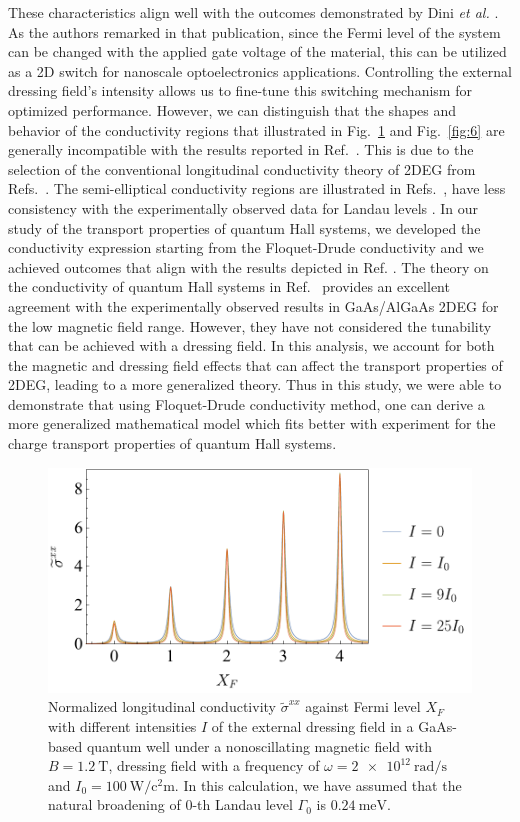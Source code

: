 These characteristics align well with the outcomes demonstrated by Dini \textit{et al.} \cite{dini16}.  As the authors remarked in that publication, since the Fermi level of the system can be changed with the applied gate voltage of the material, this can be utilized as a 2D switch for nanoscale optoelectronics applications. Controlling  the external dressing field's intensity allows us to fine-tune this switching mechanism for optimized performance.
However, we can distinguish that the shapes and behavior of the conductivity regions that illustrated in Fig.~\ref{fig:5} and Fig.~\ref{fig:6} are generally incompatible with the results reported in Ref.~\cite{dini16}. This is due to the selection of the conventional longitudinal conductivity theory of 2DEG from Refs.~\cite{ando74_1,ando82}. The semi-elliptical conductivity regions are  illustrated in Refs.~\cite{dini16,ando74_1,ando82}, have less consistency with the experimentally observed data for Landau levels \cite{endo09}.
In our study of the transport properties of quantum Hall systems, we developed the conductivity expression starting from the Floquet-Drude conductivity \cite{wackerl20} and we achieved outcomes that align with the results depicted in Ref. \cite{endo09}.
The theory on the conductivity of quantum Hall systems in Ref.~\cite{endo09} provides an excellent agreement with the experimentally observed results in GaAs/AlGaAs 2DEG for the low magnetic field range.
However, they have not considered the tunability that can be achieved with a dressing field. In this analysis, we account for both the magnetic and dressing field effects that can affect the transport properties of 2DEG, leading to a more generalized theory. Thus in this study, we were able to demonstrate that using Floquet-Drude conductivity method, one can derive a more generalized mathematical model which fits better with experiment for the charge transport properties of quantum Hall systems.

\begin{figure}[t]
\includegraphics[scale=0.54]{figures/fig_4}
\caption{ Normalized longitudinal conductivity $\widetilde{\sigma}^{xx}$ against Fermi level $X_F$ with different intensities $I$ of the external dressing field in a GaAs-based quantum well under a nonoscillating magnetic field with $B = \SI{1.2}{\tesla}$, dressing field with a  frequency of $\omega =\SI{2e12}{\radian\per\second}$ and $I_0 =\SI{100}{\watt\per\square\centi\metre}$. In this calculation, we have assumed that the natural  broadening of $0$-th Landau level $\Gamma_0$ is $\SI{0.24}{\milli\eV}$.}
\label{fig:5}
\end{figure}

